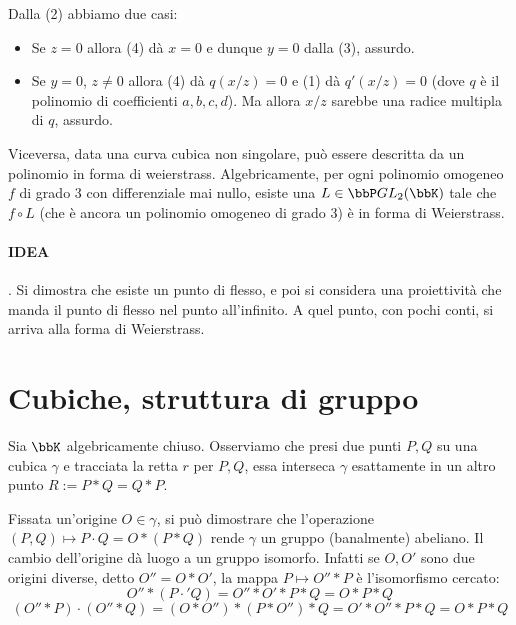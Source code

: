 Dalla (2) abbiamo due casi:

\begin{itemize}
	\item Se $z=0$ allora (4) dà $x=0$ e dunque $y=0$ dalla (3), assurdo.

	\item Se $y = 0$, $z \neq 0$ allora (4) dà $q(x/z) = 0$ e (1) dà $q'(x/z) = 0$ (dove $q$ è il polinomio di coefficienti $a,b,c,d$). Ma allora $x/z$ sarebbe una radice multipla di $q$, assurdo.
\end{itemize}

Viceversa, data una curva cubica non singolare, può essere descritta da un polinomio in forma di weierstrass. Algebricamente, per ogni polinomio omogeneo $f$ di grado 3 con differenziale mai nullo, esiste una $L \in \bbP GL_2(\bbK) $ tale che $f \circ L$ (che è ancora un polinomio omogeneo di grado 3) è in forma di Weierstrass.
\paragraph{IDEA}. Si dimostra che esiste un punto di flesso, e poi si considera una proiettività che manda il punto di flesso nel punto all'infinito. A quel punto, con pochi conti, si arriva alla forma di Weierstrass.

\section{Cubiche, struttura di gruppo}

Sia $\bbK$ algebricamente chiuso. Osserviamo che presi due punti $P,Q$ su una cubica $\gamma$ e tracciata la retta $r$ per $P,Q$, essa interseca $\gamma$ esattamente in un altro punto $R:=P * Q = Q*P$. 

Fissata un'origine $O \in \gamma$, si può dimostrare che l'operazione $(P,Q) \mapsto P \cdot Q = O*(P*Q)$ rende $\gamma$ un gruppo (banalmente) abeliano. Il cambio dell'origine dà luogo a un gruppo isomorfo. Infatti se $O,O'$ sono due origini diverse, detto $O'' = O*O'$, la mappa $P \mapsto O'' * P$ è l'isomorfismo cercato:
$$ O'' * (P \cdot' Q) = O'' * O'*P*Q = O*P*Q $$
$$ (O''*P) \cdot (O''*Q) = (O*O'')*(P*O'')*Q = O'*O''*P*Q=O*P*Q$$

